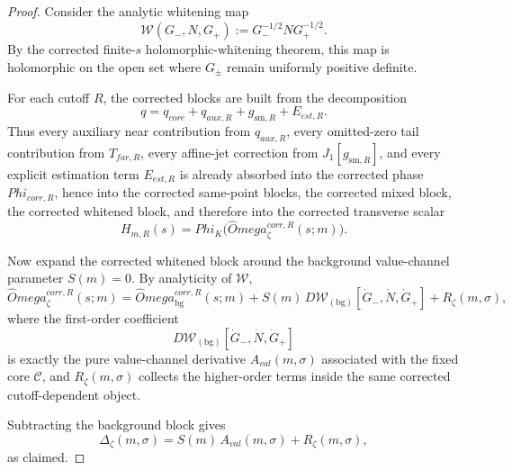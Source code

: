 \documentclass[11pt,a4paper]{amsart}
\def\Omega{Omega}%
\def\Phi{Phi}%
\def\corr{corr}%
\def\val{val}%
\def\far{far}%
\def\est{est}%
\def\core{core}%
\def\aux{aux}%
\theoremstyle{plain}
\theoremstyle{definition}
\newcommand{\sm}{\mathrm{sm}}
\newcommand{\far}{\mathrm{far}}
\newcommand{\est}{\mathrm{est}}
\newcommand{\val}{\mathrm{val}}
\newcommand{\corr}{\mathrm{corr}}
\newcommand{\bg}{\mathrm{bg}}
\newcommand{\core}{\mathrm{core}}
\newcommand{\aux}{\mathrm{aux}}
\begin{document}
\begin{proof}
Consider the analytic whitening map
\[
\mathcal W(G_-,N,G_+):=G_-^{-1/2}NG_+^{-1/2}.
\]
By the corrected finite-$s$ holomorphic-whitening theorem, this map is
holomorphic on the open set where $G_\pm$ remain uniformly positive definite.

For each cutoff $R$, the corrected blocks are built from the decomposition
\[
q=q_{\core}+q_{\aux,R}+g_{\sm,R}+E_{\est,R}.
\]
Thus every auxiliary near contribution from $q_{\aux,R}$, every omitted-zero
tail contribution from $T_{\far,R}$, every affine-jet correction from
$J_1[g_{\sm,R}]$, and every explicit estimation term $E_{\est,R}$ is already
absorbed into the corrected phase $\Phi_{\corr,R}$, hence into the corrected
same-point blocks, the corrected mixed block, the corrected whitened block,
and therefore into the corrected transverse scalar
\[
H_{m,R}(s)=\Phi_K\!\bigl(\widehat\Omega_\zeta^{\corr,R}(s;m)\bigr).
\]

Now expand the corrected whitened block around the background value-channel
parameter $S(m)=0$. By analyticity of $\mathcal W$,
\[
\widehat\Omega_\zeta^{\corr,R}(s;m)
=
\widehat\Omega_{\bg}^{\corr,R}(s;m)
+
S(m)\,D\mathcal W_{(\bg)}[\dot G_-,\dot N,\dot G_+]
+
R_\zeta(m,\sigma),
\]
where the first-order coefficient
\[
D\mathcal W_{(\bg)}[\dot G_-,\dot N,\dot G_+]
\]
is exactly the pure value-channel derivative $A_{\val}(m,\sigma)$ associated
with the fixed core $\mathcal C$, and $R_\zeta(m,\sigma)$ collects the
higher-order terms inside the same corrected cutoff-dependent object.

Subtracting the background block gives
\[
\Delta_\zeta(m,\sigma)
=
S(m)\,A_{\val}(m,\sigma)+R_\zeta(m,\sigma),
\]
as claimed.
\end{proof}
\end{document}
